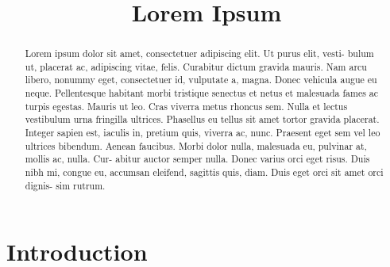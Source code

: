 \documentclass[a4paper,12pt]{hlsart}
\title{Lorem Ipsum}
\begin{document}
\maketitle
\begin{abstract}
    Lorem ipsum dolor sit amet, consectetuer adipiscing elit. Ut purus elit,
    vesti- bulum ut, placerat ac, adipiscing vitae, felis. Curabitur dictum
    gravida mauris. Nam arcu libero, nonummy eget, consectetuer id, vulputate
    a, magna. Donec vehicula augue eu neque. Pellentesque habitant morbi
    tristique senectus et netus et malesuada fames ac turpis egestas. Mauris ut
    leo. Cras viverra metus rhoncus sem. Nulla et lectus vestibulum urna
    fringilla ultrices. Phasellus eu tellus sit amet tortor gravida placerat.
    Integer sapien est, iaculis in, pretium quis, viverra ac, nunc. Praesent
    eget sem vel leo ultrices bibendum. Aenean faucibus. Morbi dolor nulla,
    malesuada eu, pulvinar at, mollis ac, nulla. Cur- abitur auctor semper
    nulla. Donec varius orci eget risus. Duis nibh mi, congue eu, accumsan
    eleifend, sagittis quis, diam. Duis eget orci sit amet orci dignis- sim
    rutrum.
\end{abstract}

\section{Introduction}
\lipsum[2-3]
\end{document}
